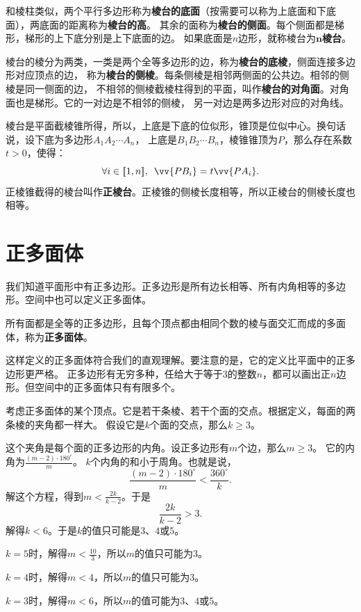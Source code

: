 \documentclass[12pt,UTF8]{ctexbook}
\begin{document}
和棱柱类似，两个平行多边形称为\textbf{棱台的底面}（按需要可以称为上底面和下底面），两底面的距离称为\textbf{棱台的高}。
其余的面称为\textbf{棱台的侧面}。每个侧面都是梯形，梯形的上下底分别是上下底面的边。
如果底面是$n$边形，就称棱台为$\mathbf{n}$\textbf{棱台}。

棱台的棱分为两类，一类是两个全等多边形的边，称为\textbf{棱台的底棱}，侧面连接多边形对应顶点的边，
称为\textbf{棱台的侧棱}。每条侧棱是相邻两侧面的公共边。相邻的侧棱是同一侧面的边，
不相邻的侧棱截棱柱得到的平面，叫作\textbf{棱台的对角面}。对角面也是梯形。它的一对边是不相邻的侧棱，
另一对边是两多边形对应的对角线。

棱台是平面截棱锥所得，所以，上底是下底的位似形，锥顶是位似中心。换句话说，设下底为多边形$A_1A_2\cdots A_n$，
上底是$B_1B_2\cdots B_n$，棱锥锥顶为$P$，那么存在系数$t>0$，使得：
$$\forall i\in\hin{1}{n},\,\,\,\vv{PB_i} = t\vv{PA_i}.$$
正棱锥截得的棱台叫作\textbf{正棱台}。正棱锥的侧棱长度相等，所以正棱台的侧棱长度也相等。

\section{正多面体}
我们知道平面形中有正多边形。正多边形是所有边长相等、所有内角相等的多边形。空间中也可以定义正多面体。

\begin{df}
    所有面都是全等的正多边形，且每个顶点都由相同个数的棱与面交汇而成的多面体，称为\textbf{正多面体}。
\end{df}

这样定义的正多面体符合我们的直观理解。要注意的是，它的定义比平面中的正多边形更严格。
正多边形有无穷多种，任给大于等于$3$的整数$n$，都可以画出正$n$边形。但空间中的正多面体只有有限多个。

考虑正多面体的某个顶点。它是若干条棱、若干个面的交点。根据定义，每面的两条棱的夹角都一样大。
假设它是$k$个面的交点，那么$k \geqslant 3$。

这个夹角是每个面的正多边形的内角。设正多边形有$m$个边，那么$m \geqslant 3$。
它的内角为$\frac{(m - 2)\cdot 180^\circ}{m}$。
$k$个内角的和小于周角。也就是说，
$$ \frac{(m - 2)\cdot 180^\circ}{m} < \frac{360^\circ}{k}.$$
解这个方程，得到$m < \frac{2k}{k - 2}$。于是
$$ \frac{2k}{k - 2} > 3.$$
解得$k < 6$。于是$k$的值只可能是$3$、$4$或$5$。

$k = 5$时，解得$m < \frac{10}{3}$，所以$m$的值只可能为$3$。

$k = 4$时，解得$m < 4$，所以$m$的值只可能为$3$。

$k = 3$时，解得$m < 6$，所以$m$的值可能为$3$、$4$或$5$。
\end{document}

